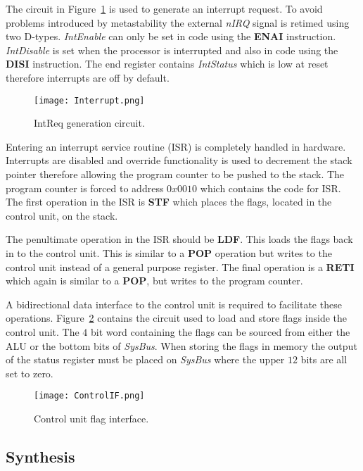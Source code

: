 The circuit in Figure~\ref{fig:IntReqCircuit} is used to generate an interrupt request.
To avoid problems introduced by metastability the external \textit{nIRQ} signal is retimed using two D-types.
\textit{IntEnable} can only be set in code using the \textbf{ENAI} instruction.
\textit{IntDisable} is set when the processor is interrupted and also in code using the \textbf{DISI} instruction.
The end register contains \textit{IntStatus} which is low at reset therefore interrupts are off by default. 

\begin{figure}[ht]
   \centering
    \texttt{[image: Interrupt.png]}
		\caption{IntReq generation circuit.}
		\label{fig:IntReqCircuit}
\end{figure}


Entering an interrupt service routine (ISR) is completely handled in hardware. 
Interrupts are disabled and override functionality is used to decrement the stack pointer therefore allowing the program counter to be pushed to the stack.
The program counter is forced to address $0x0010$ which contains the code for ISR. 
The first operation in the ISR is \textbf{STF} which places the flags, located in the control unit, on the stack.

The penultimate operation in the ISR should be \textbf{LDF}. This loads the flags back in to the control unit.
This is similar to a \textbf{POP} operation but writes to the control unit instead of a general purpose register. 
The final operation is a \textbf{RETI} which again is similar to a \textbf{POP}, but writes to the program counter.

A bidirectional data interface to the control unit is required to facilitate these operations. 
Figure~\ref{fig:FlagCircuit} contains the circuit used to load and store flags inside the control unit.
The $4$ bit word containing the flags can be sourced from either the ALU or the bottom bits of \emph{SysBus}. 
When storing the flags in memory the output of the status register must be placed on \emph{SysBus} where the upper $12$ bits are all set to zero.

\begin{figure}[ht]
   \centering
    \texttt{[image: ControlIF.png]}
		\caption{Control unit flag interface.}
		\label{fig:FlagCircuit}
\end{figure}





\subsection{Synthesis}

